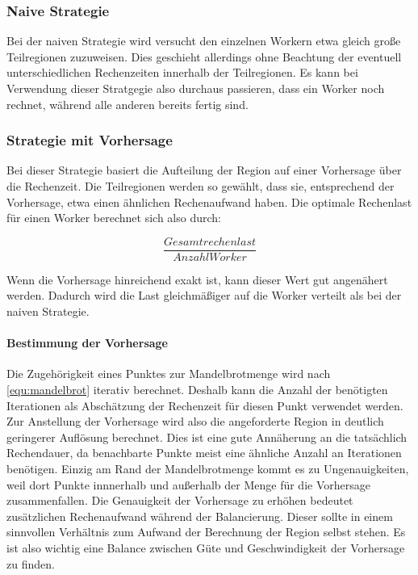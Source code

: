 \subsubsection{Naive Strategie}

Bei der naiven Strategie wird versucht den einzelnen Workern etwa gleich große Teilregionen zuzuweisen.
Dies geschieht allerdings ohne Beachtung der eventuell unterschiedlichen Rechenzeiten innerhalb der Teilregionen.
Es kann bei Verwendung dieser Stratgegie also durchaus passieren, dass ein Worker noch rechnet, während alle anderen bereits fertig sind.

\subsubsection{Strategie mit Vorhersage}

Bei dieser Strategie basiert die Aufteilung der Region auf einer Vorhersage über die Rechenzeit.
Die Teilregionen werden so gewählt, dass sie, entsprechend der Vorhersage, etwa einen ähnlichen Rechenaufwand haben.
Die optimale Rechenlast für einen Worker berechnet sich also durch:

\begin{equation}\label{equ:desiredN}
	\frac{Gesamtrechenlast}{AnzahlWorker}
\end{equation}

Wenn die Vorhersage hinreichend exakt ist, kann dieser Wert gut angenähert werden.
Dadurch wird die Last gleichmäßiger auf die Worker verteilt als bei der naiven Strategie.

\paragraph*{Bestimmung der Vorhersage}

Die Zugehörigkeit eines Punktes zur Mandelbrotmenge wird nach \autoref{equ:mandelbrot} iterativ berechnet.
Deshalb kann die Anzahl der benötigten Iterationen als Abschätzung der Rechenzeit für diesen Punkt verwendet werden.
Zur Anstellung der Vorhersage wird also die angeforderte Region in deutlich geringerer Auflösung berechnet.
Dies ist eine gute Annäherung an die tatsächlich Rechendauer, da benachbarte Punkte meist eine ähnliche Anzahl an Iterationen benötigen.
Einzig am Rand der Mandelbrotmenge kommt es zu Ungenauigkeiten, weil dort Punkte innnerhalb und außerhalb der Menge für die Vorhersage zusammenfallen.
Die Genauigkeit der Vorhersage zu erhöhen bedeutet zusätzlichen Rechenaufwand während der Balancierung.
Dieser sollte in einem sinnvollen Verhältnis zum Aufwand der Berechnung der Region selbst stehen.
Es ist also wichtig eine Balance zwischen Güte und Geschwindigkeit der Vorhersage zu finden.

